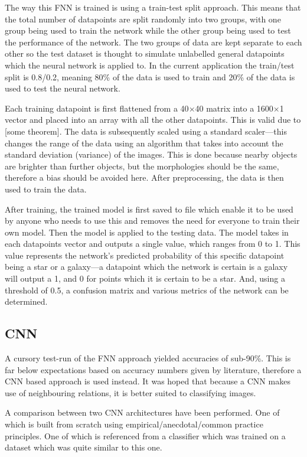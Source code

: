 \documentclass[a4paper,fleqn,usenatbib]{mnras}
\begin{document}
The way this FNN is trained is using a train-test split approach. This means that the total number of datapoints are split randomly into two groups, with one group being used to train the network while the other group being used to test the performance of the network. The two groups of data are kept separate to each other so the test dataset is thought to simulate unlabelled general datapoints which the neural network is applied to. In the current application the train/test split is 0.8/0.2, meaning 80\% of the data is used to train and 20\% of the data is used to test the neural network. 

Each training datapoint is first flattened from a 40$\times$40 matrix into a 1600$\times$1 vector and placed into an array with all the other datapoints. This is valid due to [some theorem]. The data is subsequently scaled using a standard scaler---this changes the range of the data using an algorithm that takes into account the standard deviation (variance) of the images. This is done because nearby objects are brighter than further objects, but the morphologies should be the same, therefore a bias should be avoided here. After preprocessing, the data is then used to train the data. 

After training, the trained model is first saved to file which enable it to be used by anyone who needs to use this and removes the need for everyone to train their own model. Then the model is applied to the testing data. The model takes in each datapoints vector and outputs a single value, which ranges from 0 to 1. This value represents the network's predicted probability of this specific datapoint being a star or a galaxy---a datapoint which the network is certain is a galaxy will output a 1, and 0 for points which it is certain to be a star. And, using a threshold of 0.5, a confusion matrix and various metrics of the network can be determined. 
\subsection{CNN}
A cursory test-run of the FNN approach yielded accuracies of sub-90\%. This is far below expectations based on accuracy numbers given by literature, therefore a CNN based approach is used instead. It was hoped that because a CNN makes use of neighbouring relations, it is better suited to classifying images. 

A comparison between two CNN architectures have been performed. One of which is built from scratch using empirical/anecdotal/common practice principles. One of which is referenced from a classifier which was trained on a dataset which was quite similar to this one. 
\end{document}
